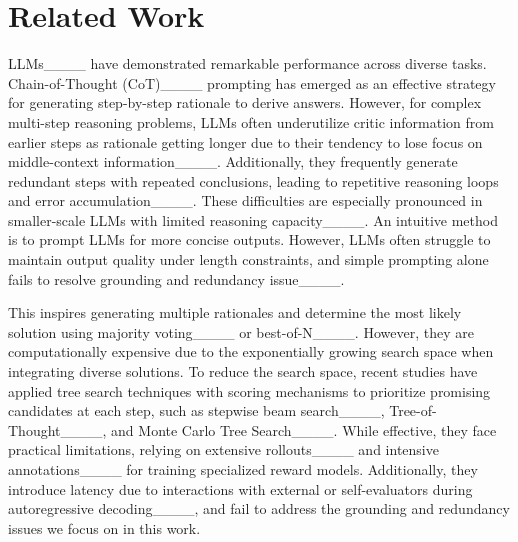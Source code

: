 \section{Related Work}
LLMs____ have demonstrated remarkable performance across diverse tasks. Chain-of-Thought (CoT)____ prompting has emerged as an effective strategy for generating step-by-step rationale to derive answers. However, for complex multi-step reasoning problems, LLMs often underutilize critic information from earlier steps as rationale getting longer due to their tendency to lose focus on middle-context information____. Additionally, they frequently generate redundant steps with repeated conclusions, leading to repetitive reasoning loops and error accumulation____. These difficulties are especially pronounced in smaller-scale LLMs with limited reasoning capacity____.
An intuitive method is to prompt LLMs for more concise outputs. However, LLMs often struggle to maintain output quality under length constraints, and simple prompting alone fails to resolve grounding and redundancy issue____. 

This inspires generating multiple rationales and determine the most likely solution using majority voting____ or best-of-N____. However, they are computationally expensive due to the exponentially growing search space when integrating diverse solutions.
To reduce the search space, recent studies have applied tree search techniques with scoring mechanisms to prioritize promising candidates at each step, such as stepwise beam search____, Tree-of-Thought____, and Monte Carlo Tree Search____. While effective, they face practical limitations, relying on extensive rollouts____ and intensive annotations____ for training specialized reward models. Additionally, they introduce latency due to interactions with external or self-evaluators during autoregressive decoding____, and fail to address the grounding and redundancy issues we focus on in this work.
